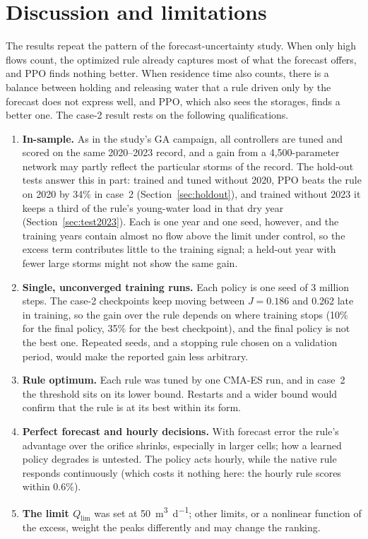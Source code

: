 \documentclass[11pt]{article}
\begin{document}
\section{Discussion and limitations}
The results repeat the pattern of the forecast-uncertainty study. When only high flows
count, the optimized rule already captures most of what the forecast offers, and PPO finds
nothing better. When residence time also counts, there is a balance between holding and
releasing water that a rule driven only by the forecast does not express well, and PPO,
which also sees the storages, finds a better one. The case-2 result rests on the following
qualifications.
\begin{enumerate}
\item \textbf{In-sample.} As in the study's GA campaign, all controllers are tuned and scored
on the same 2020--2023 record, and a gain from a 4,500-parameter network may partly reflect
the particular storms of the record. The hold-out tests answer this in part: trained and
tuned without 2020, PPO beats the rule on 2020 by 34\% in case~2 (Section~\ref{sec:holdout}),
and trained without 2023 it keeps a third of the rule's young-water load in that dry year
(Section~\ref{sec:test2023}). Each is one year and one seed, however, and the training years contain almost no flow
above the limit under control, so the excess term contributes little to the training
signal; a held-out year with fewer large storms might not show the same gain.
\item \textbf{Single, unconverged training runs.} Each policy is one seed of 3 million steps.
The case-2 checkpoints keep moving between $J = 0.186$ and 0.262 late in training, so the
gain over the rule depends on where training stops (10\% for the final policy, 35\% for
the best checkpoint), and the final policy is not the best one. Repeated seeds, and a
stopping rule chosen on a validation period, would make the reported gain less arbitrary.
\item \textbf{Rule optimum.} Each rule was tuned by one CMA-ES run, and in case~2 the
threshold sits on its lower bound. Restarts and a wider bound would confirm that the rule
is at its best within its form.
\item \textbf{Perfect forecast and hourly decisions.} With forecast error the rule's
advantage over the orifice shrinks, especially in larger cells; how a learned policy
degrades is untested. The policy acts hourly, while the native rule responds continuously
(which costs it nothing here: the hourly rule scores within 0.6\%).
\item \textbf{The limit $Q_{\lim}$} was set at \SI{50}{\m^3\per\day}; other limits, or a
nonlinear function of the excess, weight the peaks differently and may change the ranking.
\end{enumerate}
\end{document}
